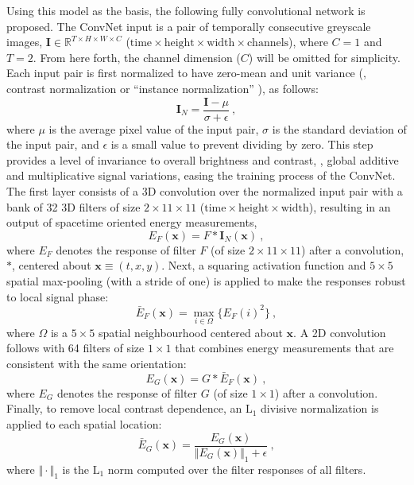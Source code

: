 Using this model as the basis, the following fully convolutional 
network \cite{shelhamer2017}  is proposed.
The ConvNet input is a pair of temporally consecutive greyscale images, $\mathbf{I} \in \mathbb{R}^{T \times H \times W \times C}$ ($\text{time} \times \text{height} \times \text{width} \times \text{channels}$), where $C=1$ and $T=2$. From here forth, the channel dimension ($C$) will be omitted for simplicity.
Each input pair is first normalized to have zero-mean and unit
variance (\ie, contrast normalization or ``instance normalization'' \cite{ulyanov2017}), as follows:
\begin{equation}
	\mathbf{I}_N = \frac{\mathbf{I} - \mu}{\sigma + \epsilon}\ ,
\end{equation}
where $\mu$ is the average pixel value of the input pair, $\sigma$ is the standard deviation of the input pair, and $\epsilon$ is a small value to prevent dividing by zero.
This step provides a level of invariance  to overall brightness and contrast, \ie, global additive and
multiplicative signal variations, easing the training process of the ConvNet. 
The first layer consists of a 3D convolution over the normalized input pair with a bank of 32 3D filters of size $2 \times 11 \times 11$
($\text{time} \times \text{height} \times \text{width}$), resulting in an output of spacetime oriented energy measurements, 
\begin{equation}
	E_F(\mathbf{x}) = F * \mathbf{I}_N(\mathbf{x})\ ,
\end{equation}
where $E_F$ denotes the response of filter $F$ (of size $2 \times 11 \times 11$) after a convolution, $*$, centered about $\mathbf{x} \equiv (t, x, y)$.
Next, a squaring activation function and $5 \times 5$
spatial max-pooling (with a stride of one) is applied to
make the responses robust to local signal phase:
\begin{equation}
	\bar{E}_F(\mathbf{x}) = \max_{i\in\Omega}\{E_F(i)^2\}\ ,
\end{equation}
where $\Omega$ is a $5 \times 5$ spatial neighbourhood centered about $\mathbf{x}$.
A 2D convolution follows with 64 filters of size $1 \times 1$ that combines
energy measurements that are consistent
with the same orientation:
\begin{equation}
	E_G(\mathbf{x}) = G * \bar{E}_F(\mathbf{x})\ ,
\end{equation}
where  $E_G$ denotes the response of filter $G$ (of size $1 \times 1$) after a convolution.
Finally, to remove local contrast dependence, an
$\text{L}_1$ divisive normalization is applied to each spatial location: 
\begin{equation}
	\bar{E}_G(\mathbf{x}) = \frac{E_G(\mathbf{x})}{\Vert E_G(\mathbf{x}) \Vert_1 + \epsilon}\ ,
\end{equation}
where $\Vert \cdot \Vert_1$ is the $\text{L}_1$ norm computed over the filter responses of all filters.

